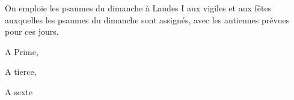 
On emploie les psaumes du dimanche à Laudes I aux vigiles et aux fêtes auxquelles les psaumes du dimanche sont assignés, avec les antiennes prévues pour ces jours.

A Prime,



A tierce,


A sexte

